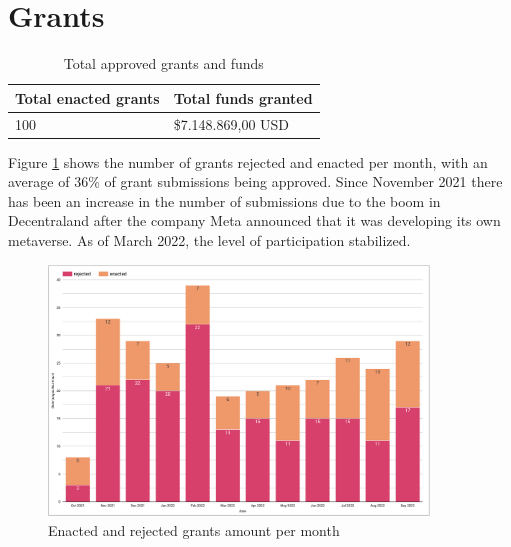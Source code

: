\documentclass[MSE,Master,english]{twbook}%
\begin{document}
\section{Grants}
\begin{center}
  \begin{table}[H]
    \begin{tabular}{ | m{20em} | m{20em} | }
      \hline
      \textbf{Total enacted grants} & \textbf{Total funds granted} \\
      \hline
      100 & \$7.148.869,00 USD \\
      \hline
    \end{tabular}
    \caption{Total approved grants and funds}
    \label{table:grants_info}
  \end{table}
\end{center}

Figure \ref{fig:grants_amount} shows the number of grants rejected and enacted per month, with an average of 36\% of grant submissions being approved. Since November 2021 there has been an increase in the number of submissions due to the boom in Decentraland after the company Meta announced that it was developing its own metaverse. As of March 2022, the level of participation stabilized.
\begin{figure}[H]
  \centering
  \includegraphics[width=0.9\textwidth]{metrics/grants_amount.png}
  \caption{Enacted and rejected grants amount per month}
  \label{fig:grants_amount}
\end{figure}
\end{document}
